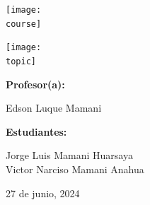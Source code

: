 \documentclass[10pt, a4paper]{article}
\newcommand{\course}{img/data_structures.png}
\newcommand{\topic}{img/skipList_and_splayTree.png}
\newcommand{\professor}{Edson Luque Mamani}
\newcommand{\students}{Jorge Luis Mamani Huarsaya\\Victor Narciso Mamani Anahua}
\newcommand{\mydate}{27 de junio, 2024}
\begin{document}
\begin{titlepage}
	\centering
	\texttt{[image: \\course]} \par
  \vfill \vfill
	\texttt{[image: \\topic]}\par
  \vfill \vfill
  {\textbf{Profesor(a):} \par}
	\professor \vfill
  {\textbf{Estudiantes:} \par}
	\students \vfill
	{\large \mydate \par}
\end{titlepage}



\end{document}
